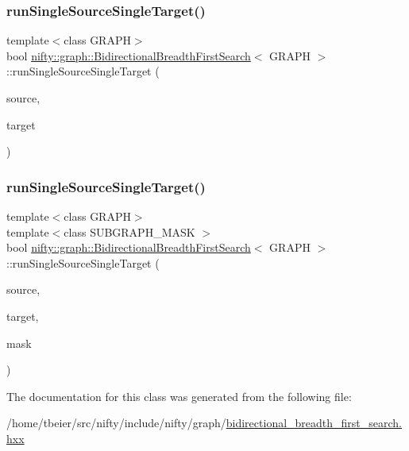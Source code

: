 \subsubsection{\texorpdfstring{run\+Single\+Source\+Single\+Target()}{runSingleSourceSingleTarget()}\hspace{0.1cm}{\footnotesize\ttfamily [1/2]}}
{\footnotesize\ttfamily template$<$class G\+R\+A\+PH$>$ \\
bool \hyperlink{classnifty_1_1graph_1_1BidirectionalBreadthFirstSearch}{nifty\+::graph\+::\+Bidirectional\+Breadth\+First\+Search}$<$ G\+R\+A\+PH $>$\+::run\+Single\+Source\+Single\+Target (\begin{DoxyParamCaption}\item[{const int64\+\_\+t}]{source,  }\item[{const int64\+\_\+t}]{target }\end{DoxyParamCaption})\hspace{0.3cm}{\ttfamily [inline]}}

\mbox{\label{classnifty_1_1graph_1_1BidirectionalBreadthFirstSearch_a4ddc85ac7f5b28bec9f729d0120b4692}} 
\subsubsection{\texorpdfstring{run\+Single\+Source\+Single\+Target()}{runSingleSourceSingleTarget()}\hspace{0.1cm}{\footnotesize\ttfamily [2/2]}}
{\footnotesize\ttfamily template$<$class G\+R\+A\+PH$>$ \\
template$<$class S\+U\+B\+G\+R\+A\+P\+H\+\_\+\+M\+A\+SK $>$ \\
bool \hyperlink{classnifty_1_1graph_1_1BidirectionalBreadthFirstSearch}{nifty\+::graph\+::\+Bidirectional\+Breadth\+First\+Search}$<$ G\+R\+A\+PH $>$\+::run\+Single\+Source\+Single\+Target (\begin{DoxyParamCaption}\item[{const int64\+\_\+t}]{source,  }\item[{const int64\+\_\+t}]{target,  }\item[{const S\+U\+B\+G\+R\+A\+P\+H\+\_\+\+M\+A\+SK \&}]{mask }\end{DoxyParamCaption})\hspace{0.3cm}{\ttfamily [inline]}}



The documentation for this class was generated from the following file\+:\begin{DoxyCompactItemize}
\item 
/home/tbeier/src/nifty/include/nifty/graph/\hyperlink{bidirectional__breadth__first__search_8hxx}{bidirectional\+\_\+breadth\+\_\+first\+\_\+search.\+hxx}\end{DoxyCompactItemize}
